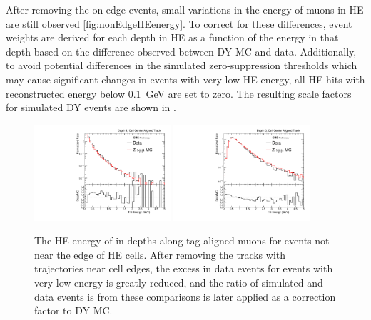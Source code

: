 After removing the on-edge events, small variations in the energy of muons in HE are still observed \cref{fig:nonEdgeHEenergy}. 
To correct for these differences, event weights are derived for each depth in HE as a function of the energy in that depth based on the difference observed between DY MC and data.
Additionally, to avoid potential differences in the simulated zero-suppression thresholds which may cause significant changes in events with very low HE energy, all HE hits with reconstructed energy below \SI{0.1}{\giga\eV} are set to zero.
The resulting scale factors for simulated DY events are shown in .

\begin{figure}[htbp]
	\centering
	\includegraphics[width=0.45\textwidth]{figures/hcalE_depth0.pdf}
        \hspace{0.01\textwidth}
        \includegraphics[width=0.45\textwidth]{figures/hcalE_depth4.pdf}
	\caption[Center-Aligned HE Energy]{The HE energy of in depths along tag-aligned muons for events not near the edge of HE cells. After removing the tracks with trajectories near cell edges, the excess in data events for events with very low energy is greatly reduced, and the ratio of simulated and data events is from these comparisons is later applied as a correction factor to DY MC.} 
        \label{fig:nonEdgeHEEnergy}
\end{figure}

